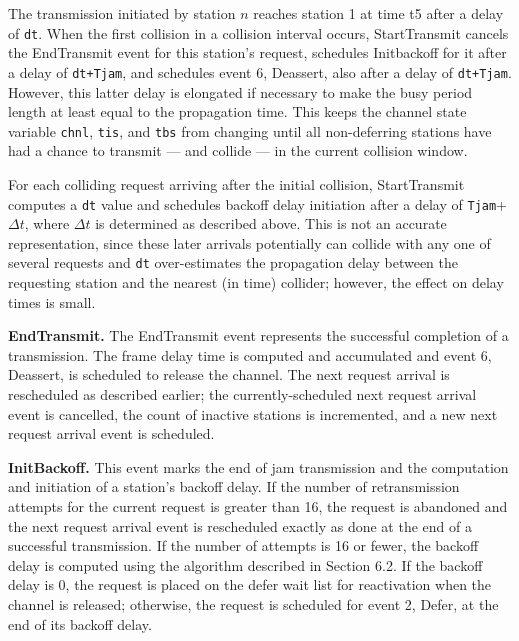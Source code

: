The transmission initiated by station $n$ reaches station 1 at time t5 after a delay of \texttt{dt}. When the first collision in a collision interval occurs, StartTransmit cancels the EndTransmit event for this station's request, schedules Initbackoff for it after a delay of \texttt{dt+Tjam}, and schedules event 6, Deassert, also after a delay of \texttt{dt+Tjam}. However, this latter delay is elongated if necessary to make the busy period length at least equal to the propagation time. This keeps the channel state variable \texttt{chnl}, \texttt{tis}, and \texttt{tbs} from changing until all non-deferring stations have had a chance to transmit --- and collide --- in the current collision window.

For each colliding request arriving after the initial collision, StartTransmit computes a \texttt{dt} value and schedules backoff delay initiation after a delay of \texttt{Tjam}+$\Delta t$, where $\Delta t$ is determined as described above. This is not an accurate representation, since these later arrivals potentially can collide with any one of several requests and \texttt{dt} over-estimates the propagation delay between the requesting station and the nearest (in time) collider; however, the effect on delay times is small.

\noindent\textbf{EndTransmit.} The EndTransmit event represents the successful completion of a transmission. The frame delay time is computed and accumulated and event 6, Deassert, is scheduled to release the channel. The next request arrival is rescheduled as described earlier; the currently-scheduled next request arrival event is cancelled, the count of inactive stations is incremented, and a new next request arrival event is scheduled.

\noindent\textbf{InitBackoff.} This event marks the end of jam transmission and the computation and initiation of a station's backoff delay. If the number of retransmission attempts for the current request is greater than 16, the request is abandoned and the next request arrival event is rescheduled exactly as
\noindent done at the end of a successful transmission. If the number of attempts is 16 or fewer, the backoff delay is computed using the algorithm described in Section 6.2. If the backoff delay is 0, the request is placed on the defer wait list for reactivation when the channel is released; otherwise, the request is scheduled for event 2, Defer, at the end of its backoff delay.

